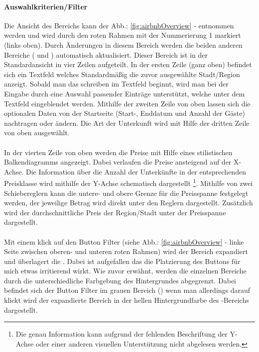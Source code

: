 \documentclass[../Bachelorarbeit.tex]{subfiles}
\begin{document}
\paragraph{Auswahlkriterien/Filter}
\label{airbnb:filter}
Die Ansicht des Bereichs  kann der Abb.: \ref{fig:airbnbOverview} -  entnommen werden und wird durch den roten Rahmen mit der Nummerierung 1 markiert (links oben).
Durch Änderungen in diesem Bereich werden die beiden anderen Bereiche ( und ) automatisch aktualisiert. 
Dieser Bereich ist in der Standardansicht in vier Zeilen aufgeteilt. 
In der ersten Zeile (ganz oben) befindet sich ein Textfeld welches Standardmäßig die zuvor ausgewählte Stadt/Region anzeigt. 
Sobald man das schreiben im Textfeld beginnt, wird man bei der Eingabe durch eine Auswahl passender Einträge unterstützt, welche unter dem Textfeld eingeblendet werden.
Mithilfe der zweiten Zeile von oben lassen sich die optionalen Daten von der Startseite (Start-, Enddatum und Anzahl der Gäste) nachtragen oder ändern.
Die Art der Unterkunft wird mit Hilfe der dritten Zeile von oben ausgewählt.\\
\\
In der vierten Zeile von oben werden die Preise mit Hilfe eines stilistischen Balkendiagramms angezeigt. Dabei verlaufen die Preise ansteigend auf der X-Achse.
Die Information über die Anzahl der Unterkünfte in der entsprechenden Preisklasse wird mithilfe der Y-Achse schematisch dargestellt
\footnote{Die genau Information kann aufgrund der fehlenden Beschriftung der Y-Achse oder einer anderen visuellen Unterstützung nicht abgelesen werden.
	}.
Mithilfe von zwei Schiebereglern kann die untere- und obere Grenze für die Preisspanne festgelegt werden, der jeweilige Betrag wird direkt unter den Reglern dargestellt.
Zusätzlich wird der durchschnittliche Preis der Region/Stadt unter der Preisspanne dargestellt.\\
\\
Mit einem klick auf den Button Filter (siehe Abb.: \ref{fig:airbnbOverview} - linke Seite zwischen oberen- und unteren roten Rahmen) wird der Bereich  expandiert und überlagert die  .
Dabei ist aufgefallen das die Platzierung des Buttons für mich etwas irritierend wirkt. 
Wie zuvor erwähnt, werden die einzelnen Bereiche durch die unterschiedliche Farbgebung des Hintergrundes abgegrenzt. 
Dabei befindet sich der Button Filter im grauen Bereich () wenn man allerdings darauf klickt wird der expandierte Bereich in der hellen Hintergrundfarbe des -Bereichs dargestellt.
\end{document}
